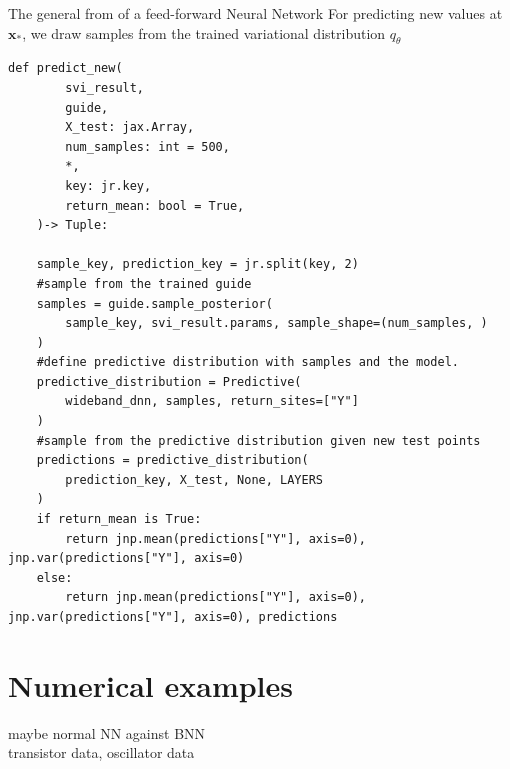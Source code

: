 \documentclass{article}
\begin{document}
The general from of a feed-forward Neural Network
For predicting new values at $\bm x_*$, we draw samples from the trained variational distribution $q_\theta $
\begin{lstlisting}
def predict_new(
        svi_result,
        guide,
        X_test: jax.Array,
        num_samples: int = 500,
        *,
        key: jr.key,
        return_mean: bool = True,
    )-> Tuple:
    
    sample_key, prediction_key = jr.split(key, 2)
    #sample from the trained guide
    samples = guide.sample_posterior(
        sample_key, svi_result.params, sample_shape=(num_samples, )
    )
    #define predictive distribution with samples and the model.
    predictive_distribution = Predictive(
        wideband_dnn, samples, return_sites=["Y"]
    )
    #sample from the predictive distribution given new test points
    predictions = predictive_distribution(
        prediction_key, X_test, None, LAYERS
    )
    if return_mean is True:
        return jnp.mean(predictions["Y"], axis=0), jnp.var(predictions["Y"], axis=0)
    else:
        return jnp.mean(predictions["Y"], axis=0), jnp.var(predictions["Y"], axis=0), predictions
\end{lstlisting}

\section{Numerical examples}
maybe normal NN against BNN\\
transistor data, oscillator data
\end{document}
